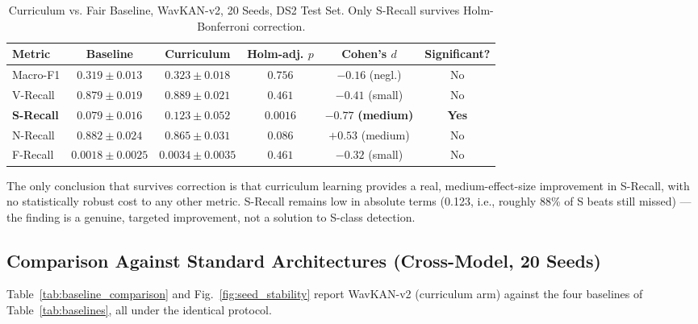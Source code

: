 \documentclass[journal,twoside,web]{ieeecolor}
\begin{document}
\begin{table}[!t]
\caption{Curriculum vs. Fair Baseline, WavKAN-v2, 20 Seeds, DS2 Test Set. Only S-Recall survives Holm-Bonferroni correction.}
\label{tab:curriculum_stats}
\centering
\footnotesize
\begin{tabular}{@{}l c c c c c@{}}
\toprule
\textbf{Metric} & \textbf{Baseline} & \textbf{Curriculum} & \textbf{Holm-adj. $p$} & \textbf{Cohen's $d$} & \textbf{Significant?} \\ \midrule
Macro-F1 & $0.319\pm0.013$ & $0.323\pm0.018$ & $0.756$ & $-0.16$ (negl.) & No \\
V-Recall & $0.879\pm0.019$ & $0.889\pm0.021$ & $0.461$ & $-0.41$ (small) & No \\
\textbf{S-Recall} & $\mathbf{0.079\pm0.016}$ & $\mathbf{0.123\pm0.052}$ & $\mathbf{0.0016}$ & $\mathbf{-0.77}$ \textbf{(medium)} & \textbf{Yes} \\
N-Recall & $0.882\pm0.024$ & $0.865\pm0.031$ & $0.086$ & $+0.53$ (medium) & No \\
F-Recall & $0.0018\pm0.0025$ & $0.0034\pm0.0035$ & $0.461$ & $-0.32$ (small) & No \\ \bottomrule
\end{tabular}
\end{table}

\noindent The only conclusion that survives correction is that curriculum learning provides a real, medium-effect-size improvement in S-Recall, with no statistically robust cost to any other metric. S-Recall remains low in absolute terms (0.123, i.e., roughly 88\% of S beats still missed) --- the finding is a genuine, targeted improvement, not a solution to S-class detection.

\subsection{Comparison Against Standard Architectures (Cross-Model, 20 Seeds)}
\label{sec:results_baselines}
Table~\ref{tab:baseline_comparison} and Fig.~\ref{fig:seed_stability} report WavKAN-v2 (curriculum arm) against the four baselines of Table~\ref{tab:baselines}, all under the identical protocol.
\end{document}
